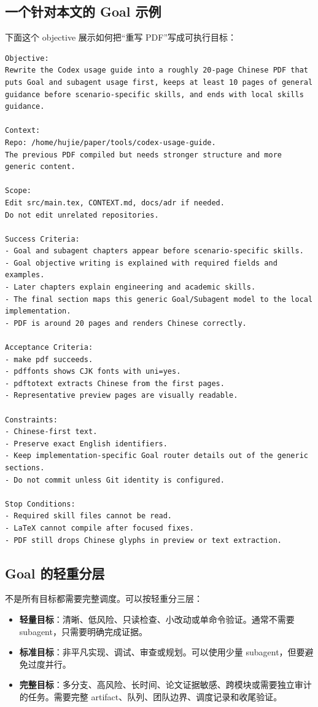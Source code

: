 \documentclass[UTF8,a4paper,11pt,fontset=none]{ctexart}
\newcommand{\keypoint}[1]{\textbf{#1}}
\begin{document}
\subsection{一个针对本文的 Goal 示例}

下面这个 objective 展示如何把“重写 PDF”写成可执行目标：

\begin{lstlisting}
Objective:
Rewrite the Codex usage guide into a roughly 20-page Chinese PDF that
puts Goal and subagent usage first, keeps at least 10 pages of general
guidance before scenario-specific skills, and ends with local skills guidance.

Context:
Repo: /home/hujie/paper/tools/codex-usage-guide.
The previous PDF compiled but needs stronger structure and more generic content.

Scope:
Edit src/main.tex, CONTEXT.md, docs/adr if needed.
Do not edit unrelated repositories.

Success Criteria:
- Goal and subagent chapters appear before scenario-specific skills.
- Goal objective writing is explained with required fields and examples.
- Later chapters explain engineering and academic skills.
- The final section maps this generic Goal/Subagent model to the local implementation.
- PDF is around 20 pages and renders Chinese correctly.

Acceptance Criteria:
- make pdf succeeds.
- pdffonts shows CJK fonts with uni=yes.
- pdftotext extracts Chinese from the first pages.
- Representative preview pages are visually readable.

Constraints:
- Chinese-first text.
- Preserve exact English identifiers.
- Keep implementation-specific Goal router details out of the generic sections.
- Do not commit unless Git identity is configured.

Stop Conditions:
- Required skill files cannot be read.
- LaTeX cannot compile after focused fixes.
- PDF still drops Chinese glyphs in preview or text extraction.
\end{lstlisting}

\subsection{Goal 的轻重分层}

不是所有目标都需要完整调度。可以按轻重分三层：

\begin{itemize}
  \item \keypoint{轻量目标}：清晰、低风险、只读检查、小改动或单命令验证。通常不需要 subagent，只需要明确完成证据。
  \item \keypoint{标准目标}：非平凡实现、调试、审查或规划。可以使用少量 subagent，但要避免过度并行。
  \item \keypoint{完整目标}：多分支、高风险、长时间、论文证据敏感、跨模块或需要独立审计的任务。需要完整 artifact、队列、团队边界、调度记录和收尾验证。
\end{itemize}
\end{document}
